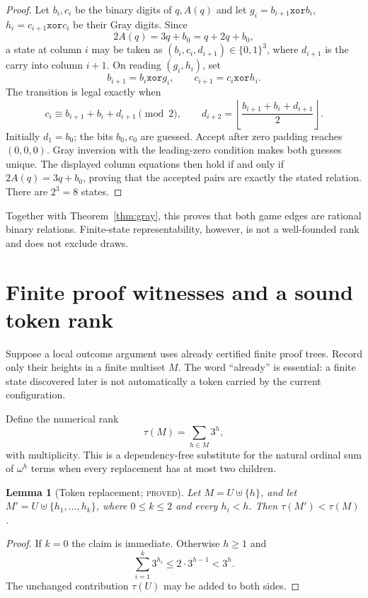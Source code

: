 \documentclass[11pt]{article}
\newtheorem{lemma}[theorem]{Lemma}
\theoremstyle{definition}
\newcommand{\xor}{\mathbin{\mathtt{xor}}}
\newcommand{\proved}{\textsc{proved}}
\begin{document}
\begin{proof}
Let $b_i,c_i$ be the binary digits of $q,A(q)$ and let
$g_i=b_{i+1}\xor b_i$, $h_i=c_{i+1}\xor c_i$ be their Gray digits.  Since
\[
  2A(q)=3q+b_0=q+2q+b_0,
\]
a state at column $i$ may be taken as
$\left(b_i,c_i,d_{i+1}\right)\in\{0,1\}^3$, where $d_{i+1}$ is the carry
into column $i+1$.  On reading $(g_i,h_i)$, set
\[
 b_{i+1}=b_i\xor g_i,\qquad c_{i+1}=c_i\xor h_i.
\]
The transition is legal exactly when
\[
 c_i\equiv b_{i+1}+b_i+d_{i+1}\pmod2,\qquad
 d_{i+2}=\left\lfloor\frac{b_{i+1}+b_i+d_{i+1}}2\right\rfloor.
\]
Initially $d_1=b_0$; the bits $b_0,c_0$ are guessed.  Accept after zero
padding reaches $(0,0,0)$.  Gray inversion with the leading-zero condition
makes both guesses unique.  The displayed column equations then hold if and
only if $2A(q)=3q+b_0$, proving that the accepted pairs are exactly the stated
relation.  There are $2^3=8$ states.
\end{proof}

Together with Theorem~\ref{thm:gray}, this proves that both game edges are
rational binary relations.  Finite-state representability, however, is not a
well-founded rank and does not exclude draws.

\section{Finite proof witnesses and a sound token rank}

Suppose a local outcome argument uses already certified finite proof trees.
Record only their heights in a finite multiset $M$.  The word
``already'' is essential: a finite state discovered later is not automatically
a token carried by the current configuration.

Define the numerical rank
\[
  \tau(M)=\sum_{h\in M}3^h,
\]
with multiplicity.  This is a dependency-free substitute for the natural
ordinal sum of $\omega^h$ terms when every replacement has at most two
children.

\begin{lemma}[Token replacement; \proved]\label{lem:token}
Let $M=U\uplus\{h\}$, and let
$M'=U\uplus\{h_1,\ldots,h_k\}$, where $0\le k\le2$ and every
$h_i<h$.  Then $\tau(M')<\tau(M)$.
\end{lemma}

\begin{proof}
If $k=0$ the claim is immediate.  Otherwise $h\ge1$ and
\[
 \sum_{i=1}^k3^{h_i}\le2\cdot3^{h-1}<3^h.
\]
The unchanged contribution $\tau(U)$ may be added to both sides.
\end{proof}
\end{document}
